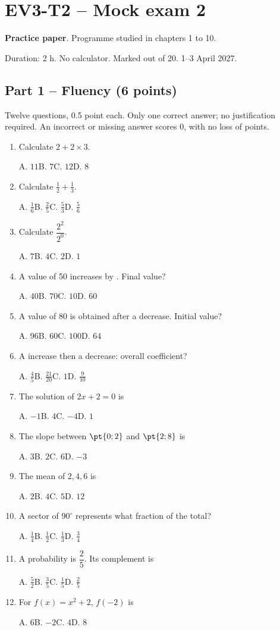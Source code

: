 \mxnewpage\section*{EV3-T2 -- Mock exam 2}\label{EV3-T2}
\textbf{Practice paper}. Programme studied in chapters 1 to 10.\par Duration: 2 h. No calculator. Marked out of 20. 1--3 April 2027.
\subsection*{Part 1 -- Fluency (6 points)}
Twelve questions, \num{0,5} point each. Only one correct answer; no justification required. An incorrect or missing answer scores 0, with no loss of points.
\begin{enumerate}
\item Calculate $2+2\times3$.\par A. $11$\quad B. $7$\quad C. $12$\quad D. $8$
\item Calculate $\frac12+\frac13$.\par A. $\frac{1}{6}$\quad B. $\frac{2}{5}$\quad C. $\frac{5}{3}$\quad D. $\frac{5}{6}$
\item Calculate $\dfrac{2^2}{2^{0}}$.\par A. $7$\quad B. $4$\quad C. $2$\quad D. $1$
\item A value of 50 increases by . Final value?\par A. $40$\quad B. $70$\quad C. $10$\quad D. $60$
\item A value of 80 is obtained after a  decrease. Initial value?\par A. $96$\quad B. $60$\quad C. $100$\quad D. $64$
\item A  increase then a  decrease: overall coefficient?\par A. $\frac{4}{5}$\quad B. $\frac{21}{20}$\quad C. $1$\quad D. $\frac{9}{10}$
\item The solution of $2x+2=0$ is\par A. $-1$\quad B. $4$\quad C. $-4$\quad D. $1$
\item The slope between $\pt{0;2}$ and $\pt{2;8}$ is\par A. $3$\quad B. $2$\quad C. $6$\quad D. $-3$
\item The mean of $2, 4, 6$ is\par A. $2$\quad B. $4$\quad C. $5$\quad D. $12$
\item A sector of $90^\circ$ represents what fraction of the total?\par A. $\frac{1}{4}$\quad B. $\frac{1}{2}$\quad C. $\frac{1}{3}$\quad D. $\frac{3}{4}$
\item A probability is $\dfrac{2}{5}$. Its complement is\par A. $\frac{5}{2}$\quad B. $\frac{3}{5}$\quad C. $\frac{1}{5}$\quad D. $\frac{2}{5}$
\item For $f(x)=x^2+2$, $f(-2)$ is\par A. $6$\quad B. $-2$\quad C. $4$\quad D. $8$
\end{enumerate}
